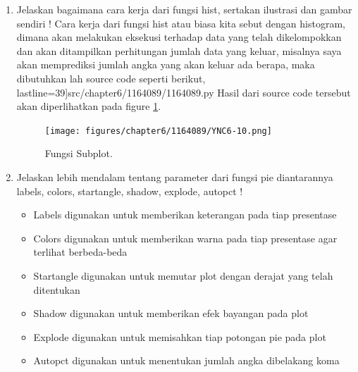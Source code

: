 \begin{enumerate}
\item Jelaskan bagaimana cara kerja dari fungsi hist, sertakan ilustrasi dan gambar sendiri !
	\subitem Cara kerja dari fungsi hist atau biasa kita sebut dengan histogram, dimana akan melakukan eksekusi terhadap data yang telah dikelompokkan dan akan ditampilkan perhitungan jumlah data yang keluar, misalnya saya akan memprediksi jumlah angka yang akan keluar ada berapa, maka dibutuhkan lah source code seperti berikut,
	 lastline=39]{src/chapter6/1164089/1164089.py}
Hasil dari source code tersebut akan diperlihatkan pada figure \ref{YNC6-10}.

		\begin{figure}[!htbp!]
			\centerline{\texttt{[image: figures/chapter6/1164089/YNC6-10.png]}}
			\caption{Fungsi Subplot.}
			\label{YNC6-10}
		\end{figure}

\item Jelaskan lebih mendalam tentang parameter dari fungsi pie diantarannya labels, colors, startangle, shadow, explode, autopct !

	\begin{itemize}
		\item Labels digunakan untuk memberikan keterangan pada tiap presentase
		\item Colors digunakan untuk memberikan warna pada tiap presentase agar terlihat berbeda-beda
		\item Startangle digunakan untuk memutar plot dengan derajat yang telah ditentukan
		\item Shadow digunakan untuk memberikan efek bayangan pada plot
		\item Explode digunakan untuk memisahkan tiap potongan pie pada plot
		\item Autopct digunakan untuk menentukan jumlah angka dibelakang koma
	\end{itemize}

\end{enumerate}


